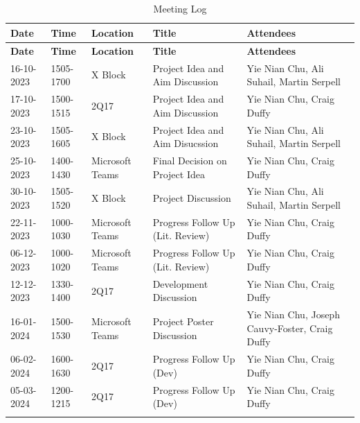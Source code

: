 \newpage
\begin{landscape}
\section{}
\label{app:appendix-e}
\begin{longtable}{ |m{2.5cm}|m{2.5cm}|m{2cm}|m{6.5cm}|m{8cm}| }
    \hline
    \rowcolor{lightgray}
    \textbf{Date} & \textbf{Time} & \textbf{Location} & \textbf{Title} & \textbf{Attendees} \\
    \hline
    \endfirsthead

    \hline
    \rowcolor{lightgray}
    \textbf{Date} & \textbf{Time} & \textbf{Location} & \textbf{Title} & \textbf{Attendees} \\
    \hline
    \endhead
    16-10-2023 & 1505-1700 & X Block & Project Idea and Aim Discussion & Yie Nian Chu, Ali Suhail, Martin Serpell \\
    \hline
    17-10-2023 & 1500-1515 & 2Q17 & Project Idea and Aim Discussion & Yie Nian Chu, Craig Duffy \\
    \hline
    23-10-2023 & 1505-1605 & X Block & Project Idea and Aim Disucssion & Yie Nian Chu, Ali Suhail, Martin Serpell \\
    \hline
    25-10-2023 & 1400-1430 & Microsoft Teams & Final Decision on Project Idea & Yie Nian Chu, Craig Duffy \\
    \hline
    30-10-2023 & 1505-1520 & X Block & Project Discussion & Yie Nian Chu, Ali Suhail, Martin Serpell \\
    \hline
    22-11-2023 & 1000-1030 & Microsoft Teams & Progress Follow Up (Lit. Review) & Yie Nian Chu, Craig Duffy \\
    \hline
    06-12-2023 & 1000-1020 & Microsoft Teams & Progress Follow Up (Lit. Review) & Yie Nian Chu, Craig Duffy \\
    \hline
    12-12-2023 & 1330-1400 & 2Q17 & Development Discussion & Yie Nian Chu, Craig Duffy \\
    \hline
    16-01-2024 & 1500-1530 & Microsoft Teams & Project Poster Discussion & Yie Nian Chu, Joseph Cauvy-Foster, Craig Duffy \\
    \hline
    06-02-2024 & 1600-1630 & 2Q17 & Progress Follow Up (Dev) & Yie Nian Chu, Craig Duffy \\
    \hline
    05-03-2024 & 1200-1215 & 2Q17 & Progress Follow Up (Dev) & Yie Nian Chu, Craig Duffy \\
    \hline
    \caption{Meeting Log}
\end{longtable}
\end{landscape}